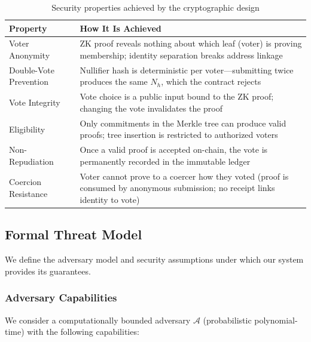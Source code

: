 \documentclass[12pt, a4paper]{report}
\begin{document}
\begin{table}[H]
\centering
\caption{Security properties achieved by the cryptographic design}
\label{tab:security_properties}
\begin{tabular}{|l|p{9cm}|}
\hline
\textbf{Property} & \textbf{How It Is Achieved} \\ \hline
Voter Anonymity & ZK proof reveals nothing about which leaf (voter) is proving membership; identity separation breaks address linkage \\ \hline
Double-Vote Prevention & Nullifier hash is deterministic per voter---submitting twice produces the same $N_h$, which the contract rejects \\ \hline
Vote Integrity & Vote choice is a public input bound to the ZK proof; changing the vote invalidates the proof \\ \hline
Eligibility & Only commitments in the Merkle tree can produce valid proofs; tree insertion is restricted to authorized voters \\ \hline
Non-Repudiation & Once a valid proof is accepted on-chain, the vote is permanently recorded in the immutable ledger \\ \hline
Coercion Resistance & Voter cannot prove to a coercer how they voted (proof is consumed by anonymous submission; no receipt links identity to vote) \\ \hline
\end{tabular}
\end{table}

\subsection{Formal Threat Model}

We define the adversary model and security assumptions under which our system provides its guarantees.

\subsubsection{Adversary Capabilities}

We consider a computationally bounded adversary $\mathcal{A}$ (probabilistic polynomial-time) with the following capabilities:
\end{document}

